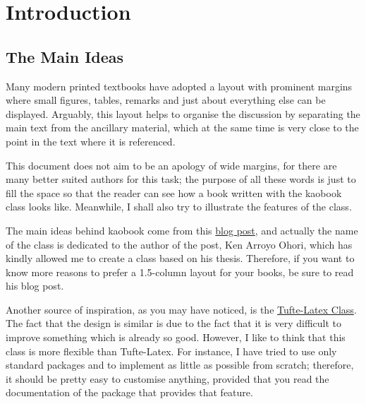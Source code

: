 \setchapterpreamble[u]{\margintoc}
\chapter{Introduction}
\label{intro}

\section{The Main Ideas}

Many modern printed textbooks have adopted a layout with prominent 
margins where small figures, tables, remarks and just about everything 
else can be displayed. Arguably, this layout helps to organise the 
	discussion by separating the main text from the ancillary material, 
	which at the same time is very close to the point in the text where 
	it is referenced.

This document does not aim to be an apology of wide margins, for there 
are many better suited authors for this task; the purpose of all these 
words is just to fill the space so that the reader can see how a book 
written with the kaobook class looks like. Meanwhile, I shall also try 
to illustrate the features of the class.

The main ideas behind kaobook come from this 
\href{https://3d.bk.tudelft.nl/ken/en/2016/04/17/a-1.5-column-layout-in-latex.html}{blog 
	post}, and actually the name of the class is dedicated to the author 
of the post, Ken Arroyo Ohori, which has kindly allowed me to create a 
class based on his thesis. Therefore, if you want to know more reasons 
to prefer a 1.5-column layout for your books, be sure to read his blog 
post.

Another source of inspiration, as you may have noticed, is the 
\href{https://github.com/Tufte-LaTeX/tufte-latex}{Tufte-Latex Class}. 
The fact that the design is similar is due to the fact that it is very 
difficult to improve something which is already so good. However, I like 
to think that this class is more flexible than Tufte-Latex. For 
instance, I have tried to use only standard packages and to implement as 
little as possible from scratch; therefore, it should be pretty easy 
to customise anything, provided that you read the documentation of the 
package that provides that feature.

